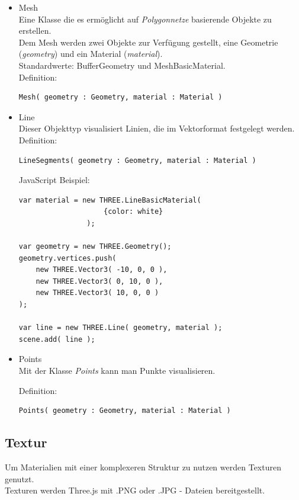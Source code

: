 \begin{itemize}
    \item Mesh \\
Eine Klasse die es ermöglicht auf \textit{Polygonnetze} basierende Objekte zu erstellen. \\
Dem Mesh werden zwei Objekte zur Verfügung gestellt, eine Geometrie (\textit{geometry}) und ein Material (\textit{material}). \\ 
Standardwerte: BufferGeometry und MeshBasicMaterial. \\
Definition:
\begin{lstlisting}
Mesh( geometry : Geometry, material : Material )
\end{lstlisting}
    \item Line \\
Dieser Objekttyp visualisiert Linien, die im Vektorformat festgelegt werden. \\
Definition:
\begin{lstlisting}
LineSegments( geometry : Geometry, material : Material )
\end{lstlisting}
JavaScript Beispiel:
\begin{lstlisting}
var material = new THREE.LineBasicMaterial(
                    {color: white}
                );

var geometry = new THREE.Geometry();
geometry.vertices.push(
	new THREE.Vector3( -10, 0, 0 ),
	new THREE.Vector3( 0, 10, 0 ),
	new THREE.Vector3( 10, 0, 0 )
);

var line = new THREE.Line( geometry, material );
scene.add( line );
\end{lstlisting}
    \item Points \\ 
Mit der Klasse \textit{Points} kann man Punkte visualisieren.

Definition:
\begin{lstlisting}
Points( geometry : Geometry, material : Material )
\end{lstlisting}
\end{itemize}
\newpage
\subsection{Textur}
Um Materialien mit einer komplexeren Struktur zu nutzen werden Texturen genutzt. \\
Texturen werden Three.js mit .PNG oder .JPG - Dateien bereitgestellt.

